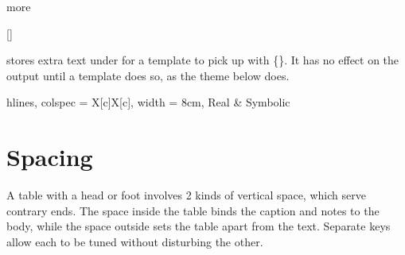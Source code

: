 \begin{codedescribe}[
        key,
        new=2021L
    ]{more}
    \begin{codesyntax}
        []
    \end{codesyntax}
     stores extra text under  for a template to pick up with \{\}. It has no effect on the output until a template does so, as the theme below does.

    \begin{codestore}[st=outer:more]
        \begin{talltblr}[
            theme = checked,
            more{checked} = {October 2026},
            caption = {A table with extra text in its foot},
            ]{
            hlines, colspec = {X[c]X[c]}, width = 8cm,
            }
            Real & Symbolic
        \end{talltblr}\end{codestore}
    \begin{center}
    \end{center}
\end{codedescribe}

\section{Spacing}\label{outer:spacing}
A table with a head or foot involves 2 kinds of vertical space, which serve contrary ends. The space inside the table binds the caption and notes to the body, while the space outside sets the table apart from the text. Separate keys allow each to be tuned without disturbing the other.


